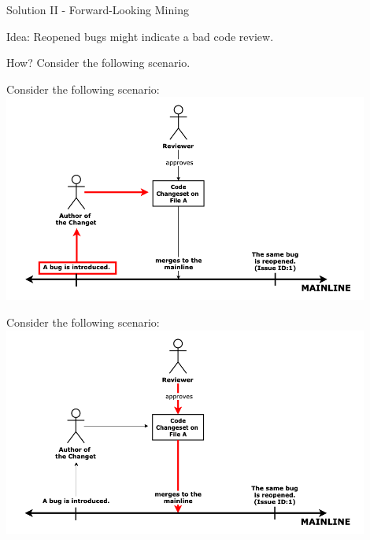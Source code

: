 \documentclass{beamer}
\begin{document}
    \begin{frame}[noframenumbering]{Solution II - Forward-Looking Mining}
        \begin{block}{Idea:}
        Reopened bugs might indicate a bad code review.
        \end{block}
        \pause
        \begin{exampleblock}{How?}
        Consider the following scenario.
        \end{exampleblock}
    \end{frame}
    
    \begin{frame}[noframenumbering]{Consider the following scenario:}
    \centering\includegraphics[width=0.9\textwidth]{img/future_mining_1.png}\newline\newline
    \caption{To fix a bug, a developer creates a pull request.}
    \end{frame}
    
    \begin{frame}[noframenumbering]{Consider the following scenario:}
    \centering\includegraphics[width=0.9\textwidth]{img/future_mining_2.png}\newline\newline
    \caption{The assigned reviewer approves the pull request and the bug is closed.}
    \end{frame}  
    
\end{document}
